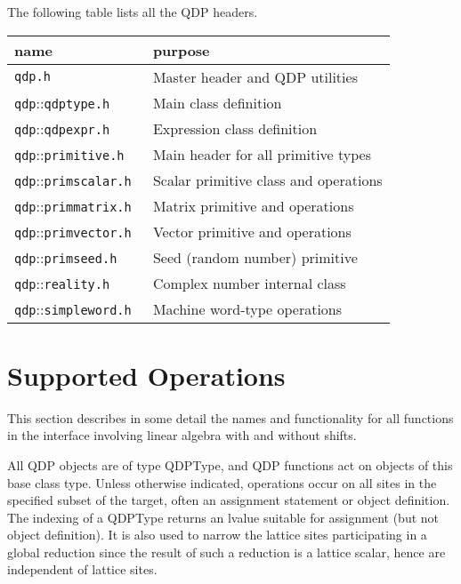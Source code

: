 \documentclass[12pt,letterpaper]{article}
\newcommand{\ttdash}{{::}}
\begin{document}
The following table lists all the QDP headers.
\begin{center}
\begin{tabular}{|l|l|}
\hline
 name & purpose \\
\hline
 {\tt qdp.h                        } & Master header and QDP utilities     \\
 {\tt qdp}\ttdash{\tt qdptype.h    } & Main class definition               \\
 {\tt qdp}\ttdash{\tt qdpexpr.h    } & Expression class definition         \\
 {\tt qdp}\ttdash{\tt primitive.h  } & Main header for all primitive types \\
 {\tt qdp}\ttdash{\tt primscalar.h } & Scalar primitive class and operations \\
 {\tt qdp}\ttdash{\tt primmatrix.h } & Matrix primitive and operations \\
 {\tt qdp}\ttdash{\tt primvector.h } & Vector primitive and operations \\
 {\tt qdp}\ttdash{\tt primseed.h   } & Seed (random number) primitive  \\
 {\tt qdp}\ttdash{\tt reality.h    } & Complex number internal class  \\
 {\tt qdp}\ttdash{\tt simpleword.h } & Machine word-type operations  \\
\hline
\end{tabular}
\end{center}


\newpage

\section{Supported Operations}
\label{sec:supported}

This section describes in some detail the names and functionality for
all functions in the interface involving linear algebra with and
without shifts.  

All QDP objects are of type QDPType, and QDP functions act on objects
of this base class type. Unless otherwise indicated, operations occur
on all sites in the specified subset of the target, often an
assignment statement or object definition. The indexing of a QDPType
returns an lvalue suitable for assignment (but not object
definition). It is also used to narrow the lattice sites participating
in a global reduction since the result of such a reduction is a
lattice scalar, hence are independent of lattice sites.
\end{document}
